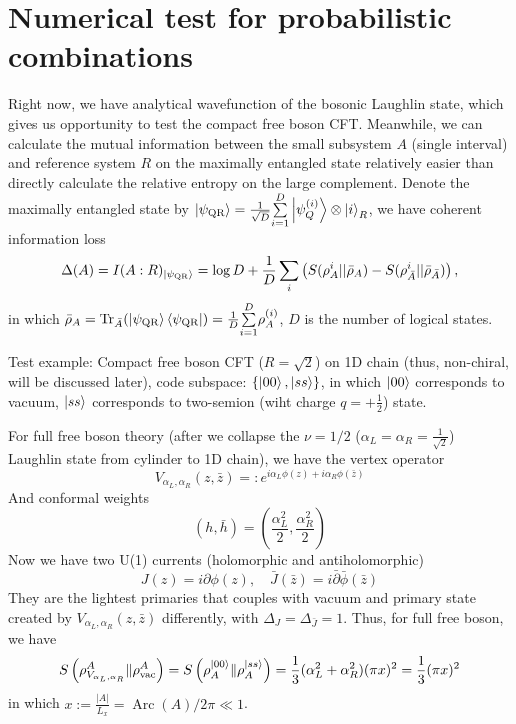 \documentclass{article}
\theoremstyle{plain}
\theoremstyle{definition}
\theoremstyle{plain}
\begin{document}
\section{Numerical test for probabilistic combinations}

Right now, we have analytical wavefunction of the bosonic Laughlin state, which gives us opportunity to test the compact free boson CFT. Meanwhile, we can calculate the mutual information between the small subsystem $A$ (single interval) and reference system $R$ on the maximally entangled state relatively easier than directly calculate the relative entropy on the large complement. Denote the maximally entangled state by $\ket{\psi_{\text{QR}}}=\frac{1}{\sqrt{D}}\overunderset{D}{i=1}{\sum}\ket{\psi_Q^{(i)}}\otimes \ket{i}_R$, we have coherent information loss
\begin{equation}
\begin{aligned}
    \Delta(A) = I(A:R)_{\ket{\psi_{\text{QR}}}}= \log D +\frac{1}{D} \sum_i  \left( S(\rho^i_{A} || \bar{\rho}_{A}) - S(\rho^i_{\bar{A}} || \bar{\rho}_{\bar{A}}) \right),
\end{aligned}
\end{equation}
in which $\bar{\rho}_{A}=\operatorname{Tr}_{\bar{A}}(\ket{\psi_{\text{QR}}}\bra{\psi_{\text{QR}}})=\frac{1}{D}\overunderset{D}{i=1}{\sum}\rho_A^{(i)}$, $D$ is the number of logical states.

Test example: Compact free boson CFT ($R=\sqrt{2}$) on 1D chain (thus, non-chiral, will be discussed later), code subspace: $\{\ket{00},\ket{ss}\}$, in which $\ket{00}$ corresponds to vacuum, $\ket{ss}$ corresponds to two-semion (wiht charge $q=+\frac{1}{2}$) state.

For full free boson theory (after we collapse the $\nu=1/2$ ($\alpha_L=\alpha_R=\frac{1}{\sqrt{2}}$) Laughlin state from cylinder to 1D chain), we have the vertex operator
\begin{equation}
    V_{\alpha_L, \alpha_R}(z, \bar{z})=: e^{i \alpha_L \phi(z)+i \alpha_R \phi(\bar{z})}
\end{equation}
And conformal weights
\begin{equation}
    (h, \bar{h})=\left(\frac{\alpha_L^2}{2}, \frac{\alpha_R^2}{2}\right)
\end{equation}
Now we have two U(1) currents (holomorphic and antiholomorphic)
\begin{equation}
    J(z)=i \partial \phi(z), \quad \bar{J}(\bar{z})=i \bar{\partial} \bar{\phi}(\bar{z})
\end{equation}
They are the lightest primaries that couples with vacuum and primary state created by $V_{\alpha_L, \alpha_R}(z, \bar{z})$ differently, with $\Delta_J=\Delta_{\bar{J}}=1$. Thus, for full free boson, we have
\begin{equation}
    S\left(\rho_{V_{\alpha_L,\alpha_R}}^{A} \| \rho_{\mathrm{vac}}^{A}\right)=S\left(\rho_{A}^{\ket{00}} \| \rho_{A}^{\ket{ss}}\right)=\frac{1}{3}(\alpha_L^2+\alpha_R^2)(\pi x)^2=\frac{1}{3}(\pi x)^2
\end{equation}
in which $x:=\frac{|A|}{L_x}=\operatorname{Arc}(A)/2\pi\ll 1$.
\end{document}
